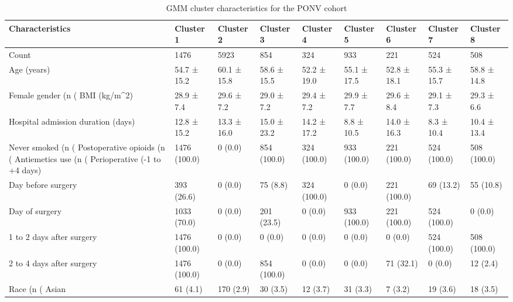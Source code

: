 \begin{table}

\caption{GMM cluster characteristics for the PONV cohort}
\centering
\begin{tabular}[t]{lllllllll}
\toprule
Characteristics & Cluster 1 & Cluster 2 & Cluster 3 & Cluster 4 & Cluster 5 & Cluster 6 & Cluster 7 & Cluster 8\\
\midrule
Count & 1476 & 5923 & 854 & 324 & 933 & 221 & 524 & 508\\
Age (years) & 54.7 ± 15.2 & 60.1 ± 15.8 & 58.6 ± 15.5 & 52.2 ± 19.0 & 55.1 ± 17.5 & 52.8 ± 18.1 & 55.3 ± 15.7 & 58.8 ± 14.8\\
Female gender (n (%
BMI (kg/m^2) & 28.9 ± 7.4 & 29.6 ± 7.2 & 29.0 ± 7.2 & 29.4 ± 7.2 & 29.9 ± 7.7 & 29.6 ± 8.4 & 29.1 ± 7.3 & 29.3 ± 6.6\\
Hospital admission duration (days) & 12.8 ± 15.2 & 13.3 ± 16.0 & 15.0 ± 23.2 & 14.2 ± 17.2 & 8.8 ± 10.5 & 14.0 ± 16.3 & 8.3 ± 10.4 & 10.4 ± 13.4\\
\addlinespace
Never smoked (n (%
Postoperative opioids (n (%
Antiemetics use (n (%
Perioperative (-1 to +4 days) & 1476 (100.0) & 0 (0.0) & 854 (100.0) & 324 (100.0) & 933 (100.0) & 221 (100.0) & 524 (100.0) & 508 (100.0)\\
Day before surgery & 393 (26.6) & 0 (0.0) & 75 (8.8) & 324 (100.0) & 0 (0.0) & 221 (100.0) & 69 (13.2) & 55 (10.8)\\
\addlinespace
Day of surgery & 1033 (70.0) & 0 (0.0) & 201 (23.5) & 0 (0.0) & 933 (100.0) & 221 (100.0) & 524 (100.0) & 0 (0.0)\\
1 to 2 days after surgery & 1476 (100.0) & 0 (0.0) & 0 (0.0) & 0 (0.0) & 0 (0.0) & 0 (0.0) & 524 (100.0) & 508 (100.0)\\
2 to 4 days after surgery & 1476 (100.0) & 0 (0.0) & 854 (100.0) & 0 (0.0) & 0 (0.0) & 71 (32.1) & 0 (0.0) & 12 (2.4)\\
Race (n (%
Asian & 61 (4.1) & 170 (2.9) & 30 (3.5) & 12 (3.7) & 31 (3.3) & 7 (3.2) & 19 (3.6) & 18 (3.5)\\

\end{tabular}
\end{table}
